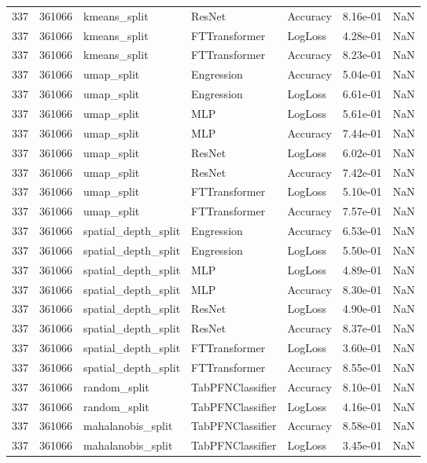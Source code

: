 \begin{tabular}{rrlllrr}
337 & 361066 & kmeans\_split & ResNet & Accuracy & 8.16e-01 & NaN \\
337 & 361066 & kmeans\_split & FTTransformer & LogLoss & 4.28e-01 & NaN \\
337 & 361066 & kmeans\_split & FTTransformer & Accuracy & 8.23e-01 & NaN \\
337 & 361066 & umap\_split & Engression & Accuracy & 5.04e-01 & NaN \\
337 & 361066 & umap\_split & Engression & LogLoss & 6.61e-01 & NaN \\
337 & 361066 & umap\_split & MLP & LogLoss & 5.61e-01 & NaN \\
337 & 361066 & umap\_split & MLP & Accuracy & 7.44e-01 & NaN \\
337 & 361066 & umap\_split & ResNet & LogLoss & 6.02e-01 & NaN \\
337 & 361066 & umap\_split & ResNet & Accuracy & 7.42e-01 & NaN \\
337 & 361066 & umap\_split & FTTransformer & LogLoss & 5.10e-01 & NaN \\
337 & 361066 & umap\_split & FTTransformer & Accuracy & 7.57e-01 & NaN \\
337 & 361066 & spatial\_depth\_split & Engression & Accuracy & 6.53e-01 & NaN \\
337 & 361066 & spatial\_depth\_split & Engression & LogLoss & 5.50e-01 & NaN \\
337 & 361066 & spatial\_depth\_split & MLP & LogLoss & 4.89e-01 & NaN \\
337 & 361066 & spatial\_depth\_split & MLP & Accuracy & 8.30e-01 & NaN \\
337 & 361066 & spatial\_depth\_split & ResNet & LogLoss & 4.90e-01 & NaN \\
337 & 361066 & spatial\_depth\_split & ResNet & Accuracy & 8.37e-01 & NaN \\
337 & 361066 & spatial\_depth\_split & FTTransformer & LogLoss & 3.60e-01 & NaN \\
337 & 361066 & spatial\_depth\_split & FTTransformer & Accuracy & 8.55e-01 & NaN \\
337 & 361066 & random\_split & TabPFNClassifier & Accuracy & 8.10e-01 & NaN \\
337 & 361066 & random\_split & TabPFNClassifier & LogLoss & 4.16e-01 & NaN \\
337 & 361066 & mahalanobis\_split & TabPFNClassifier & Accuracy & 8.58e-01 & NaN \\
337 & 361066 & mahalanobis\_split & TabPFNClassifier & LogLoss & 3.45e-01 & NaN \\

\end{tabular}
